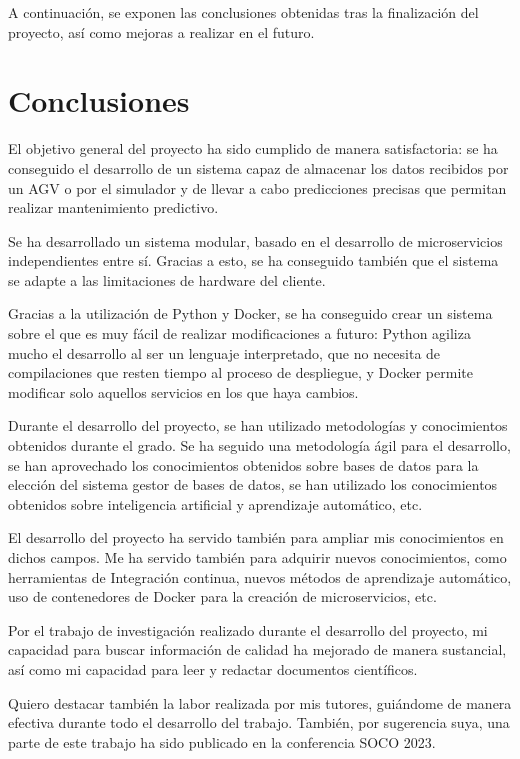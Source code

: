 
A continuación, se exponen las conclusiones obtenidas tras la finalización del proyecto, así como mejoras a realizar 
en el futuro.

\section{Conclusiones}

El objetivo general del proyecto ha sido cumplido de manera satisfactoria: se ha conseguido el desarrollo de un sistema
capaz de almacenar los datos recibidos por un AGV o por el simulador y de llevar a cabo predicciones precisas que permitan 
realizar mantenimiento predictivo.

Se ha desarrollado un sistema modular, basado en el desarrollo de microservicios independientes entre sí. Gracias a
esto, se ha conseguido también que el sistema se adapte a las limitaciones de hardware del cliente.

Gracias a la utilización de Python y Docker, se ha conseguido crear un sistema sobre el que es muy fácil de realizar 
modificaciones a futuro: Python agiliza mucho el desarrollo al ser un lenguaje interpretado, que no necesita de compilaciones 
que resten tiempo al proceso de despliegue, y Docker permite modificar solo aquellos servicios en los que haya cambios.

Durante el desarrollo del proyecto, se han utilizado metodologías y conocimientos obtenidos durante el grado. Se 
ha seguido una metodología ágil para el desarrollo, se han aprovechado los conocimientos obtenidos sobre bases de 
datos para la elección del sistema gestor de bases de datos, se han utilizado los conocimientos obtenidos sobre 
inteligencia artificial y aprendizaje automático, etc.

El desarrollo del proyecto ha servido también para ampliar mis conocimientos en dichos campos. Me ha servido 
también para adquirir nuevos conocimientos, como herramientas de Integración continua, nuevos métodos de aprendizaje 
automático, uso de contenedores de Docker para la creación de microservicios, etc.

Por el trabajo de investigación realizado durante el desarrollo del proyecto, mi capacidad para buscar información 
de calidad ha mejorado de manera sustancial, así como mi capacidad para leer y redactar documentos científicos.

Quiero destacar también la labor realizada por mis tutores, guiándome de manera efectiva durante todo el desarrollo del 
trabajo. También, por sugerencia suya, una parte de este trabajo ha sido publicado en la conferencia SOCO 2023.

